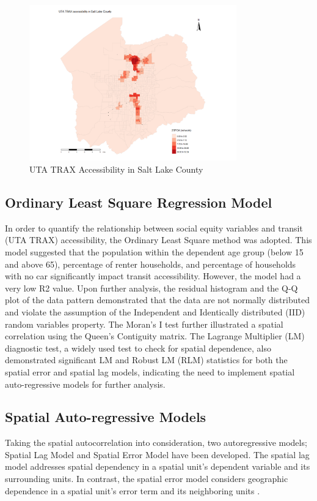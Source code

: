 \documentclass[numbered]{trbunofficial}
\begin{document}
\begin{figure}[!ht]
  \centering
  \includegraphics[width=0.8\textwidth]{TSFCA.jpg}
  \caption{UTA TRAX Accessibility in Salt Lake County}\label{fig:trial}
\end{figure}

\subsection{Ordinary Least Square Regression Model}

In order to quantify the relationship between social equity variables and transit (UTA TRAX) accessibility, the Ordinary Least Square method was adopted. This model suggested that the population within the dependent age group (below 15 and above 65), percentage of renter households, and percentage of households with no car significantly impact transit accessibility. However, the model had a very low R2 value. Upon further analysis, the residual histogram and the Q-Q plot of the data pattern demonstrated that the data are not normally distributed and violate the assumption of the Independent and Identically distributed (IID) random variables property. The Moran's I test further illustrated a spatial correlation using the Queen's Contiguity matrix. The Lagrange Multiplier (LM) diagnostic test, a widely used test to check for spatial dependence, also demonstrated significant LM and Robust LM (RLM) statistics for both the spatial error and spatial lag models, indicating the need to implement spatial auto-regressive models for further analysis.

\subsection{Spatial Auto-regressive Models}
Taking the spatial autocorrelation into consideration, two autoregressive models; Spatial Lag Model and Spatial Error Model have been developed. The spatial lag model addresses spatial dependency in a spatial unit's dependent variable and its surrounding units. In contrast, the spatial error model considers geographic dependence in a spatial unit's error term and its neighboring units \cite{Saputro2019}.
\end{document}
